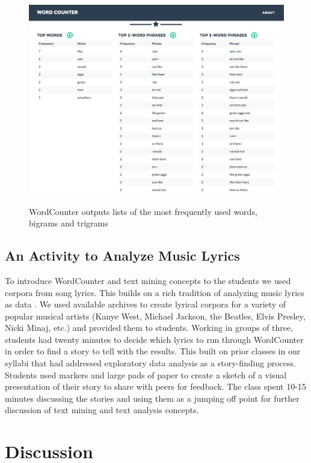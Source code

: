 \documentclass{acm_proc_article-sp}
\begin{document}
\begin{figure}[h]
\caption{WordCounter outputs lists of the most frequently used words, bigrams and trigrams}
\includegraphics[width=\linewidth]{wordcounterresults}
\label{fig:wordcounterresults}
\end{figure}

\subsection{An Activity to Analyze Music Lyrics}

To introduce WordCounter and text mining concepts to the students we used corpora from song lyrics. This builds on a rich tradition of analyzing music lyrics as data \cite{wattenberg_arc_2002,hemphill_rap_2014}. We used available archives to create lyrical corpora for a variety of popular musical artists (Kanye West, Michael Jackson, the Beatles, Elvis Presley, Nicki Minaj, etc.) and provided them to students. Working in groups of three, students had twenty minutes to decide which lyrics to run through WordCounter in order to find a story to tell with the results. This built on prior classes in our syllabi that had addressed exploratory data analysis as a story-finding process. Students used markers and large pads of paper to create a sketch of a visual presentation of their story to share with peers for feedback. The class spent 10-15 minutes discussing the stories and using them as a jumping off point for further discussion of text mining and text analysis concepts. 

\section{Discussion}
\end{document}
